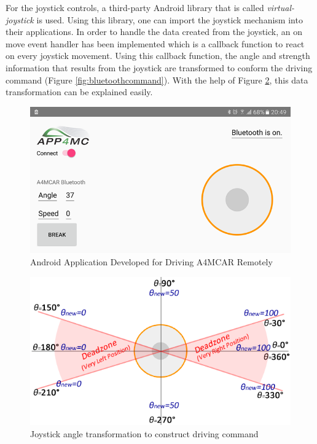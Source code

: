 For the joystick controls, a third-party Android library that is called \textit{virtual-joystick} \cite{virtualjoystick} is used. Using this library, one can import the joystick mechanism into their applications. In order to handle the data created from the joystick, an on move event handler has been implemented which is a callback function to react on every joystick movement. Using this callback function, the angle and strength information that results from the joystick are transformed to conform the driving command (Figure \ref{fig:bluetoothcommand}). With the help of Figure \ref{fig:joystickpie}, this data transformation can be explained easily.
\begin{figure}[!ht]
	\centering
	\captionsetup{justification=centering}
	\includegraphics[scale=0.6]{content/images/androidapp.png}
	\caption{Android Application Developed for Driving A4MCAR Remotely}
	\label{fig:androidapp}
\end{figure}
\begin{figure}[!ht]
	\centering
	\captionsetup{justification=centering}
	\includegraphics[scale=0.6]{content/images/joystickpie.png}
	\caption{Joystick angle transformation to construct driving command}
	\label{fig:joystickpie}
\end{figure}

